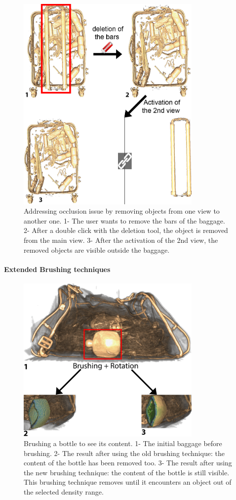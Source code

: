 \begin{figure}
\centering   	\includegraphics[width=9cm]{Figures/deletion.png}
	\caption{ Addressing occlusion issue by removing objects from one view to another one. 1- The user wants to remove the bars of the baggage. 2- After a double click with the deletion tool, the object is removed from the main view. 3- After the activation of the 2nd view, the removed objects are visible outside the baggage.}
	\label{f:deletion}
\end{figure}

\paragraph{Extended Brushing techniques}

\begin{figure}
\centering   	\includegraphics[width=9cm]{Figures/brushing-new.png}
	\caption{ Brushing a bottle to see its content.  1- The initial baggage before brushing. 2- The result after using the old brushing technique: the content of the bottle has been removed too. 3- The result after using the new brushing technique: the content of the bottle is still visible. This brushing technique removes until it encounters an object out of the selected density range. }
	\label{f:brushing_new}
\end{figure}

